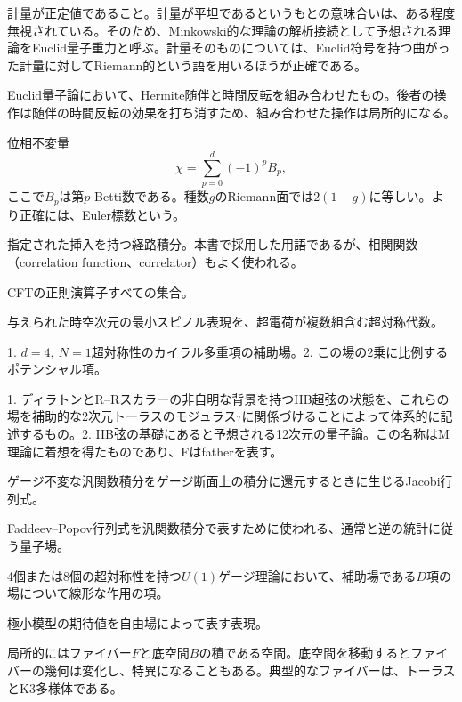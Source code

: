 {計量が正定値であること。計量が平坦であるというもとの意味合いは、ある程度無視されている。そのため、Minkowski的な理論の解析接続として予想される理論をEuclid量子重力と呼ぶ。計量そのものについては、Euclid符号を持つ曲がった計量に対してRiemann的という語を用いるほうが正確である。}

{Euclid量子論において、Hermite随伴と時間反転を組み合わせたもの。後者の操作は随伴の時間反転の効果を打ち消すため、組み合わせた操作は局所的になる。}

{位相不変量
\[
\chi=\sum_{p=0}^{d}(-1)^pB_p,
\]
ここで$B_p$は第$p$ Betti数である。種数$g$のRiemann面では$2(1-g)$に等しい。より正確には、Euler標数という。}

{指定された挿入を持つ経路積分。本書で採用した用語であるが、相関関数（correlation function、correlator）もよく使われる。}

{CFTの正則演算子すべての集合。}

{与えられた時空次元の最小スピノル表現を、超電荷が複数組含む超対称代数。}

{1. $d=4,\ N=1$超対称性のカイラル多重項の補助場。2. この場の2乗に比例するポテンシャル項。}

{1. ディラトンとR--Rスカラーの非自明な背景を持つIIB超弦の状態を、これらの場を補助的な2次元トーラスのモジュラス$\tau$に関係づけることによって体系的に記述するもの。2. IIB弦の基礎にあると予想される12次元の量子論。この名称はM理論に着想を得たものであり、Fはfatherを表す。}

{ゲージ不変な汎関数積分をゲージ断面上の積分に還元するときに生じるJacobi行列式。}

{Faddeev--Popov行列式を汎関数積分で表すために使われる、通常と逆の統計に従う量子場。}

{4個または8個の超対称性を持つ$U(1)$ゲージ理論において、補助場である$D$項の場について線形な作用の項。}

{極小模型の期待値を自由場によって表す表現。}

{局所的にはファイバー$F$と底空間$B$の積である空間。底空間を移動するとファイバーの幾何は変化し、特異になることもある。典型的なファイバーは、トーラスとK3多様体である。}

